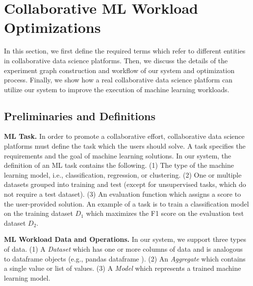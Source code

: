 \section{Collaborative ML Workload Optimizations} \label{sec-ml-workloads}
In this section, we first define the required terms which refer to different entities in collaborative data science platforms. 
Then, we discuss the details of the experiment graph construction and workflow of our system and optimization process.
Finally, we show how a real collaborative data science platform can utilize our system to improve the execution of machine learning workloads.

\subsection{Preliminaries and Definitions}
\textbf{ML Task.} 
In order to promote a collaborative effort, collaborative data science platforms must define the task which the users should solve.
A task specifies the requirements and the goal of machine learning solutions.
In our system, the definition of an ML task contains the following.
(1) The type of the machine learning model, i.e., classification, regression, or clustering.
(2) One or multiple datasets grouped into training and test (except for unsupervised tasks, which do not require a test dataset).
(3) An evaluation function which assigns a score to the user-provided solution.
An example of a task is to train a classification model on the training dataset $D_1$ which maximizes the F1 score on the evaluation test dataset $D_2$.

\textbf{ML Workload Data and Operations.}
In our system, we support three types of data.
(1) A \textit{Dataset} which has one or more columns of data and is analogous to dataframe objects (e.g., pandas dataframe \cite{mckinney-proc-scipy-2010}).
(2) An \textit{Aggregate} which contains a single value or list of values.
(3) A \textit{Model} which represents a trained machine learning model.

